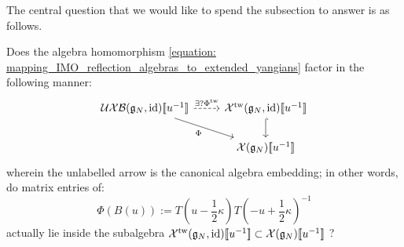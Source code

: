             The central question that we would like to spend the subsection to answer is as follows.
            \begin{question}
                Does the algebra homomorphism \eqref{equation: mapping_IMO_reflection_algebras_to_extended_yangians} factor in the following manner:
                    \begin{equation} \label{diagram: mapping_IMO_reflection_algebras_to_extended_twisted_yangians}
                        \begin{tikzcd}
                            {\UXB(\g_N, \id)[\![u^{-1}]\!]} & {\calX^{\tw}(\g_N, \id)[\![u^{-1}]\!]} \\
                            & {\calX(\g_N)[\![u^{-1}]\!]}
                            \arrow["{\exists ? \Phi^{\tw}}", dashed, from=1-1, to=1-2]
                            \arrow["\Phi"', from=1-1, to=2-2]
                            \arrow[hook, from=1-2, to=2-2]
                        \end{tikzcd}
                    \end{equation}
                wherein the unlabelled arrow is the canonical algebra embedding; in other words, do matrix entries of:
                    $$\Phi(B(u)) := T\left(u - \frac12 \kappa\right) T\left(-u + \frac12 \kappa\right)^{-1}$$
                actually lie inside the subalgebra $\mathcal{X}^{\mathrm{tw}}(\mathfrak{g}_N, \mathrm{id})[\![u^{-1}]\!] \subset \mathcal{X}(\mathfrak{g}_N)[\![u^{-1}]\!]$ ?
            \end{question}
        
